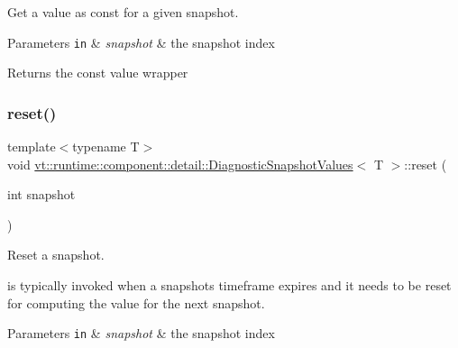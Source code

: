 Get a value as const for a given snapshot. 


\begin{DoxyParams}[1]{Parameters}
\mbox{\tt in}  & {\em snapshot} & the snapshot index\\
\hline
\end{DoxyParams}
\begin{DoxyReturn}{Returns}
the const value wrapper 
\end{DoxyReturn}
\mbox{\label{structvt_1_1runtime_1_1component_1_1detail_1_1_diagnostic_snapshot_values_ac8bd81d164c5928dfd4213ddfd0d0206}} 
\subsubsection{\texorpdfstring{reset()}{reset()}}
{\footnotesize\ttfamily template$<$typename T$>$ \\
void \hyperlink{structvt_1_1runtime_1_1component_1_1detail_1_1_diagnostic_snapshot_values}{vt\+::runtime\+::component\+::detail\+::\+Diagnostic\+Snapshot\+Values}$<$ T $>$\+::reset (\begin{DoxyParamCaption}\item[{int}]{snapshot }\end{DoxyParamCaption})\hspace{0.3cm}{\ttfamily [inline]}}



Reset a snapshot. 

is typically invoked when a snapshot\textquotesingle{}s timeframe expires and it needs to be reset for computing the value for the next snapshot.


\begin{DoxyParams}[1]{Parameters}
\mbox{\tt in}  & {\em snapshot} & the snapshot index \\
\hline
\end{DoxyParams}
\mbox{\label{structvt_1_1runtime_1_1component_1_1detail_1_1_diagnostic_snapshot_values_aeb6c8d74a72eba5610ba7d2ba966b91f}} 
